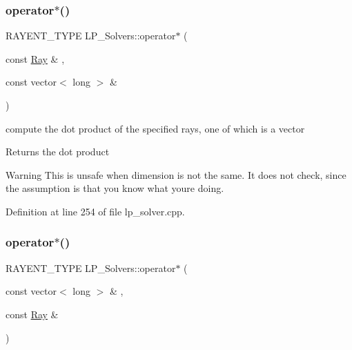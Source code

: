 \subsubsection{\texorpdfstring{operator$\ast$()}{operator*()}\hspace{0.1cm}{\footnotesize\ttfamily [3/6]}}
{\footnotesize\ttfamily R\+A\+Y\+E\+N\+T\+\_\+\+T\+Y\+PE L\+P\+\_\+\+Solvers\+::operator$\ast$ (\begin{DoxyParamCaption}\item[{const \hyperlink{group___c_l_s_solvers_class_l_p___solvers_1_1_ray}{Ray} \&}]{,  }\item[{const vector$<$ long $>$ \&}]{ }\end{DoxyParamCaption})}



compute the dot product of the specified rays, one of which is a vector 

\begin{DoxyReturn}{Returns}
the dot product 
\end{DoxyReturn}
\begin{DoxyWarning}{Warning}
This is unsafe when dimension is not the same. It does not check, since the assumption is that you know what you\textquotesingle{}re doing. 
\end{DoxyWarning}


Definition at line 254 of file lp\+\_\+solver.\+cpp.

\mbox{\label{group___c_l_s_solvers_gab64c33abcc54e5b175b7b567e099c75b}} 
\subsubsection{\texorpdfstring{operator$\ast$()}{operator*()}\hspace{0.1cm}{\footnotesize\ttfamily [4/6]}}
{\footnotesize\ttfamily R\+A\+Y\+E\+N\+T\+\_\+\+T\+Y\+PE L\+P\+\_\+\+Solvers\+::operator$\ast$ (\begin{DoxyParamCaption}\item[{const vector$<$ long $>$ \&}]{,  }\item[{const \hyperlink{group___c_l_s_solvers_class_l_p___solvers_1_1_ray}{Ray} \&}]{ }\end{DoxyParamCaption})}



